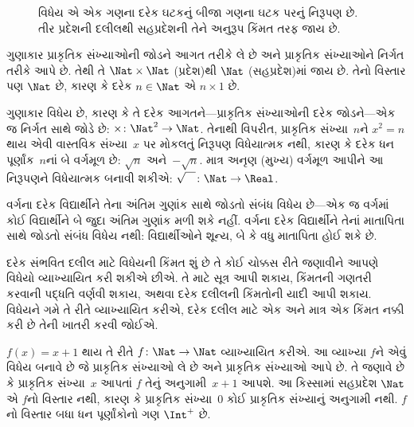 \begin{figure}
  \caption{વિધેય એ એક ગણના દરેક ઘટકનું બીજા ગણના
    ઘટક પરનું નિરૂપણ છે. તીર પ્રદેશની દલીલથી
    સહપ્રદેશની તેને અનુરૂપ કિંમત તરફ જાય છે.}
\end{figure}

\begin{ex}
ગુણાકાર પ્રાકૃતિક સંખ્યાઓની જોડને આગત તરીકે લે છે અને
પ્રાકૃતિક સંખ્યાઓને નિર્ગત તરીકે આપે છે. તેથી તે
$\Nat \times \Nat$ (પ્રદેશ)થી $\Nat$ (સહપ્રદેશ)માં જાય છે.
તેનો વિસ્તાર પણ $\Nat$ છે, કારણ કે દરેક $n \in \Nat$
એ $n \times 1$ છે.
\end{ex}

\begin{ex}
ગુણાકાર વિધેય છે, કારણ કે તે દરેક આગતને---પ્રાકૃતિક સંખ્યાઓની
દરેક જોડને---એક જ નિર્ગત સાથે જોડે છે:
$\times \colon \Nat^2 \to
\Nat$. તેનાથી વિપરીત, પ્રાકૃતિક સંખ્યા~$n$ને
$x^2 = n$ થાય એવી વાસ્તવિક સંખ્યા~$x$ પર મોકલતું નિરૂપણ
વિધેયાત્મક નથી, કારણ કે દરેક ધન પૂર્ણાંક~$n$નાં બે વર્ગમૂળ
છે: $\sqrt{n}$ અને~$-\sqrt{n}$. માત્ર અનૃણ (મુખ્ય) વર્ગમૂળ આપીને
આ નિરૂપણને વિધેયાત્મક બનાવી શકીએ:
$\sqrt{\phantom{X}} \colon
\Nat \to \Real$.
\end{ex}

\begin{ex}
વર્ગના દરેક વિદ્યાર્થીને તેના અંતિમ ગુણાંક સાથે જોડતો સંબંધ
વિધેય છે---એક જ વર્ગમાં કોઈ વિદ્યાર્થીને બે જુદા અંતિમ
ગુણાંક મળી શકે નહીં. વર્ગના દરેક વિદ્યાર્થીને તેનાં
માતાપિતા સાથે જોડતો સંબંધ વિધેય નથી: વિદ્યાર્થીઓને
શૂન્ય, બે કે વધુ માતાપિતા હોઈ શકે છે.
\end{ex}

\begin{explain}
દરેક સંભવિત દલીલ માટે વિધેયની કિંમત શું છે તે કોઈ ચોક્કસ
રીતે જણાવીને આપણે વિધેયો વ્યાખ્યાયિત કરી શકીએ છીએ.
તે માટે સૂત્ર આપી શકાય, કિંમતની ગણતરી કરવાની પદ્ધતિ
વર્ણવી શકાય, અથવા દરેક દલીલની કિંમતોની યાદી આપી શકાય.
વિધેયને ગમે તે રીતે વ્યાખ્યાયિત કરીએ, દરેક દલીલ માટે
એક અને માત્ર એક કિંમત નક્કી કરી છે તેની ખાતરી કરવી જોઈએ.
\end{explain}

\begin{ex}
$f(x) = x+1$ થાય તે રીતે $f \colon \Nat \to \Nat$
વ્યાખ્યાયિત કરીએ. આ વ્યાખ્યા $f$ને એવું વિધેય બનાવે છે
જે પ્રાકૃતિક સંખ્યાઓ લે છે અને પ્રાકૃતિક સંખ્યાઓ આપે છે.
તે જણાવે છે કે પ્રાકૃતિક સંખ્યા~$x$ આપતાં $f$ તેનું
અનુગામી~$x+1$ આપશે.
આ કિસ્સામાં સહપ્રદેશ $\Nat$ એ $f$નો વિસ્તાર નથી,
કારણ કે પ્રાકૃતિક સંખ્યા~$0$ કોઈ પ્રાકૃતિક સંખ્યાનું
અનુગામી નથી. $f$નો વિસ્તાર બધા ધન પૂર્ણાંકોનો ગણ
$\Int^{+}$ છે.
\end{ex}

